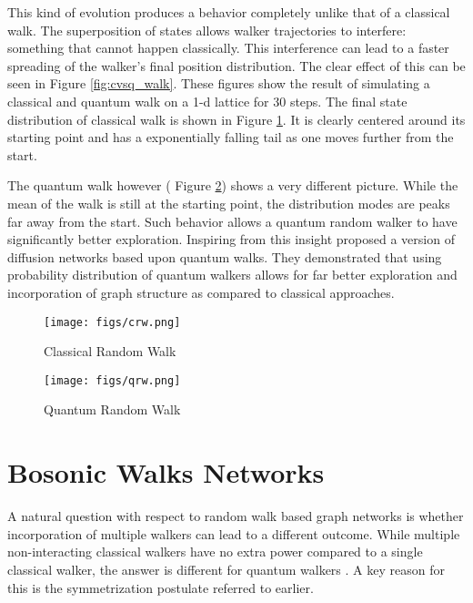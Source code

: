 \documentclass{article}
\begin{document}
This kind of evolution produces a behavior completely unlike that of a classical walk. The superposition of states allows walker trajectories to interfere: something that cannot happen classically. This interference can lead to a faster spreading of the walker's final position distribution. The clear effect of this can be seen in Figure \ref{fig:cvsq_walk}. These figures show the result of simulating a classical and quantum walk on a 1-d lattice for 30 steps.
The final state distribution of classical walk is shown in Figure \ref{fig:cvsq_walk:a}. It is clearly centered around its starting point and has a exponentially falling tail as one moves further from the start.

The quantum walk however ( Figure \ref{fig:cvsq_walk:b}) shows a very different picture. While the mean of the walk is still at the starting point, the distribution modes are peaks far away from the start. Such behavior allows a quantum random walker to have significantly better exploration. Inspiring from this insight \cite{Dernbach2018QuantumWI} proposed a version of diffusion networks based upon quantum walks. They demonstrated that using probability distribution of quantum walkers allows for far better exploration and incorporation of graph structure as compared to classical approaches.


\begin{figure*}
    \centering
    \begin{subfigure}{0.45\linewidth}
    \texttt{[image: figs/crw.png]}
    \caption{Classical Random Walk  \label{fig:cvsq_walk:a} }
    \end{subfigure}\qquad
    \begin{subfigure}{0.45\linewidth}
    \texttt{[image: figs/qrw.png]}
    \caption{Quantum Random Walk  \label{fig:cvsq_walk:b} }
    \end{subfigure}
    \caption{Comparing classical and quantum walk \label{fig:cvsq_walk}}
\end{figure*}





\section{Bosonic Walks Networks}

A natural question with respect to random walk based graph networks is whether incorporation of multiple walkers can lead to a different outcome. While multiple non-interacting classical walkers have no extra power compared to a single classical walker, the answer is different for quantum walkers \citep{Chandrashekar_2012}. A key reason for this is the symmetrization postulate referred to earlier.
\end{document}
